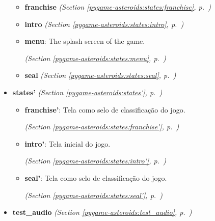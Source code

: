 \begin{itemize}
  \begin{itemize}
\setlength{\parskip}{0ex}
    \item \textbf{franchise}
  \textit{(Section \ref{pygame-asteroids:states:franchise}, p.~\pageref{pygame-asteroids:states:franchise})}

    \item \textbf{intro}
  \textit{(Section \ref{pygame-asteroids:states:intro}, p.~\pageref{pygame-asteroids:states:intro})}

    \item \textbf{menu}: The splash screen of the game.



  \textit{(Section \ref{pygame-asteroids:states:menu}, p.~\pageref{pygame-asteroids:states:menu})}

    \item \textbf{seal}
  \textit{(Section \ref{pygame-asteroids:states:seal}, p.~\pageref{pygame-asteroids:states:seal})}

  \end{itemize}
\item \textbf{states'}
  \textit{(Section \ref{pygame-asteroids:states'}, p.~\pageref{pygame-asteroids:states'})}

  \begin{itemize}
\setlength{\parskip}{0ex}
    \item \textbf{franchise'}: Tela como selo de classificação do jogo.



  \textit{(Section \ref{pygame-asteroids:states:franchise'}, p.~\pageref{pygame-asteroids:states:franchise'})}

    \item \textbf{intro'}: Tela inicial do jogo.



  \textit{(Section \ref{pygame-asteroids:states:intro'}, p.~\pageref{pygame-asteroids:states:intro'})}

    \item \textbf{seal'}: Tela como selo de classificação do jogo.



  \textit{(Section \ref{pygame-asteroids:states:seal'}, p.~\pageref{pygame-asteroids:states:seal'})}

  \end{itemize}
\item \textbf{test\_audio}
  \textit{(Section \ref{pygame-asteroids:test_audio}, p.~\pageref{pygame-asteroids:test_audio})}


\end{itemize}
